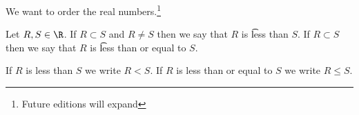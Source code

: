 

We want to order the real numbers.\footnote{Future editions will expand}


Let $R, S \in \R$.
If $R \subset S$ and $R \neq S$ then we say that $R$ is \t{less than} $S$.
If $R \subset S$ then we say that $R$ is \t{less than or equal to} $S$.


If $R$ is less than $S$ we write $R < S$.
If $R$ is less than or equal to $S$ we write $R \leq S$.

\blankpage
